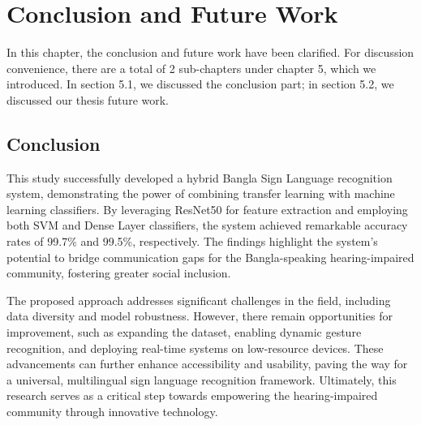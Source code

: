 %
%
\let\textcircled=\pgftextcircled
\chapter{Conclusion and Future Work}
\label{chap:result}
In this chapter, the conclusion and future work have been clarified. For discussion convenience, there are a total of 2 sub-chapters under chapter 5, which we introduced. In section 5.1, we discussed the conclusion part; in section 5.2, we discussed our thesis future work.

\vspace{150mm}

\section{Conclusion}
\label{sec:sec5_1}
This study successfully developed a hybrid Bangla Sign Language recognition system, demonstrating the power of combining transfer learning with machine learning classifiers. By leveraging ResNet50 for feature extraction and employing both SVM and Dense Layer classifiers, the system achieved remarkable accuracy rates of 99.7\% and 99.5\%, respectively. The findings highlight the system's potential to bridge communication gaps for the Bangla-speaking hearing-impaired community, fostering greater social inclusion.

The proposed approach addresses significant challenges in the field, including data diversity and model robustness. However, there remain opportunities for improvement, such as expanding the dataset, enabling dynamic gesture recognition, and deploying real-time systems on low-resource devices. These advancements can further enhance accessibility and usability, paving the way for a universal, multilingual sign language recognition framework. Ultimately, this research serves as a critical step towards empowering the hearing-impaired community through innovative technology.

